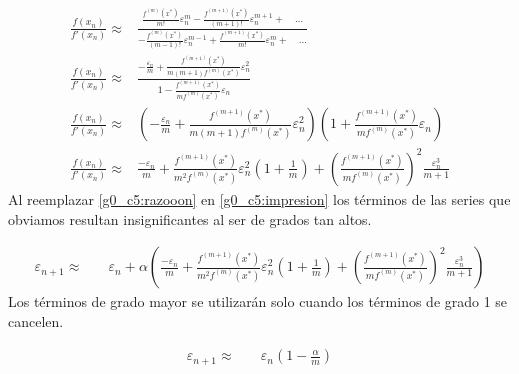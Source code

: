 \documentclass[../portafolio.tex]{subfiles}
\begin{document}
\begin{align}
\frac{f(x_n)}{f'(x_n)}\approx& \frac{\frac{f^{(m)}(x^*)}{m!}\varepsilon^{m}_n - \frac{f^{(m+1)}(x^*)}{(m+1)!}\varepsilon^{m+1}_n+ \quad ...}{-\frac{f^{(m)}(x^*)}{(m-1)!}\varepsilon^{m-1}_n + \frac{f^{(m+1)}(x^*)}{m!}\varepsilon^{m}_n+ \quad ...}\\
\frac{f(x_n)}{f'(x_n)}\approx &\frac{-\frac{\varepsilon_n}{m}+ \frac{f^{(m+1)}(x^*)}{m(m+1)f^{(m)}(x^*)}\varepsilon^{2}_n}{1  -  \frac{f^{(m+1)}(x^*)}{m f^{(m)}(x^*)}\varepsilon_n }\\
\frac{f(x_n)}{f'(x_n)}\approx& \left( -\frac{\varepsilon_n}{m}+ \frac{f^{(m+1)}(x^*)}{m(m+1)f^{(m)}(x^*)}\varepsilon^{2}_n \right) \left(1 +  \frac{f^{(m+1)}(x^*)}{m f^{(m)}(x^*)}\varepsilon_n \right)\\
\frac{f(x_n)}{f'(x_n)}\approx& \frac{-\varepsilon_n}{m} +\frac{f^{(m+1)}(x^*)}{m^2 f^{(m)}(x^*)}\varepsilon_n^{2}\left(1+\frac{1}{m}\right) + \left( \frac{f^{(m+1)}(x^*)}{m f^{(m)}(x^*)} \right)^2 \frac{\varepsilon_n^{3}}{m+1} \label{g0_c5:razooon}
\end{align}
Al reemplazar \eqref{g0_c5:razooon} en \eqref{g0_c5:impresion} los términos de las series que obviamos resultan insignificantes al ser de grados tan altos. 


\begin{align}
\varepsilon_{n+1} \approx&  \quad \varepsilon_n + \alpha \left( \frac{-\varepsilon_n}{m} +\frac{f^{(m+1)}(x^*)}{m^2 f^{(m)}(x^*)}\varepsilon_n^{2}\left(1+\frac{1}{m}\right) + \left( \frac{f^{(m+1)}(x^*)}{m f^{(m)}(x^*)} \right)^2 \frac{\varepsilon_n^{3}}{m+1} \right)
\end{align}
Los términos de grado mayor se utilizarán solo cuando los términos de grado 1 se cancelen.


\begin{align}
\varepsilon_{n+1} \approx&  \quad \varepsilon_n \left(1 - \frac{\alpha}{m} \right)
\end{align}
\end{document}
